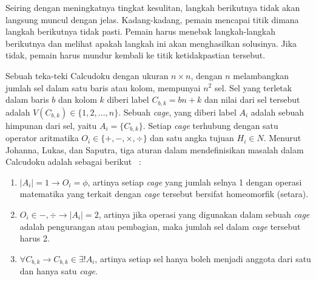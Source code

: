 Seiring dengan meningkatnya tingkat kesulitan, langkah berikutnya tidak akan langsung muncul dengan jelas. Kadang-kadang, pemain mencapai titik dimana langkah berikutnya tidak pasti. Pemain harus menebak langkah-langkah berikutnya dan melihat apakah langkah ini akan menghasilkan solusinya. Jika tidak, pemain harus mundur kembali ke titik ketidakpastian tersebut.

Sebuah teka-teki Calcudoku dengan ukuran \begin{math}n \times n\end{math}, dengan \begin{math}n\end{math} melambangkan jumlah sel dalam satu baris atau kolom, mempunyai \begin{math}n^2\end{math} sel. Sel yang terletak dalam baris \begin{math}b\end{math} dan kolom \begin{math}k\end{math} diberi label \begin{math}C_{b,k} = bn + k\end{math} dan nilai dari sel tersebut adalah \begin{math}V(C_{b,k}) \in \{1, 2, ..., n\}\end{math}. Sebuah \textit{cage}, yang diberi label \begin{math}A_i\end{math} adalah sebuah himpunan dari sel, yaitu \begin{math}A_i = \{C_{b,k}\}\end{math}. Setiap \textit{cage} terhubung dengan satu operator aritmatika \begin{math}O_i \in \{+, -, \times, \div\}\end{math} dan satu angka tujuan \begin{math}H_i \in N\end{math}. Menurut Johanna, Lukas, dan Saputra, tiga aturan dalam mendefinisikan masalah dalam Calcudoku adalah sebagai berikut ~\cite{johanna:12:hybrid}:
\begin{enumerate}
\item \begin{math}|A_i| = 1 \rightarrow O_i = \phi\end{math}, artinya setiap \textit{cage} yang jumlah selnya 1 dengan operasi matematika yang terkait dengan \textit{cage} tersebut bersifat homeomorfik (setara).
\item \begin{math}O_i \in {-, \div} \rightarrow |A_i| = 2\end{math}, artinya jika operasi yang digunakan dalam sebuah \textit{cage} adalah pengurangan atau pembagian, maka jumlah sel dalam \textit{cage} tersebut harus 2.
\item \begin{math}\forall C_{b,k} \rightarrow C_{b,k} \in \exists! A_i\end{math}, artinya setiap sel hanya boleh menjadi anggota dari satu dan hanya satu \textit{cage}.
\end{enumerate}
